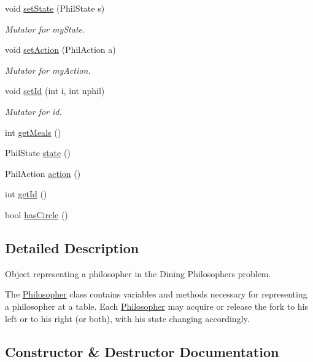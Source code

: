 \begin{DoxyCompactItemize}
void \hyperlink{class_philosopher_ad17179822ef90cea812252fa11709ad7}{set\+State} (Phil\+State s)
\begin{DoxyCompactList}\small\item\em Mutator for my\+State. \end{DoxyCompactList}\item 
void \hyperlink{class_philosopher_afbeb831cc699beac308607e43ca0693d}{set\+Action} (Phil\+Action a)
\begin{DoxyCompactList}\small\item\em Mutator for my\+Action. \end{DoxyCompactList}\item 
void \hyperlink{class_philosopher_a052dca3c30eb699b594aa0c086554a30}{set\+Id} (int i, int nphil)
\begin{DoxyCompactList}\small\item\em Mutator for id. \end{DoxyCompactList}\item 
int \hyperlink{class_philosopher_aec2c6ca7096a9ae51f35e0f68b167345}{get\+Meals} ()
\item 
Phil\+State \hyperlink{class_philosopher_a04862832ab8b79fd45ddec5e0546775a}{state} ()
\item 
Phil\+Action \hyperlink{class_philosopher_a0e6078cacfe93f71cc7f027e0b3a8971}{action} ()
\item 
int \hyperlink{class_philosopher_adea5fd87303d0365985cb87c7666e452}{get\+Id} ()
\item 
bool \hyperlink{class_philosopher_a3718addd7037cd1266435e7c91e84388}{has\+Circle} ()
\end{DoxyCompactItemize}


\subsection{Detailed Description}
Object representing a philosopher in the Dining Philosophers\textquotesingle{} problem. 

The \hyperlink{class_philosopher}{Philosopher} class contains variables and methods necessary for representing a philosopher at a table. Each \hyperlink{class_philosopher}{Philosopher} may acquire or release the fork to his left or to his right (or both), with his state changing accordingly. 

\subsection{Constructor \& Destructor Documentation}
\mbox{\label{class_philosopher_affffff67acd52b945fb91277c52af8a3}} 
